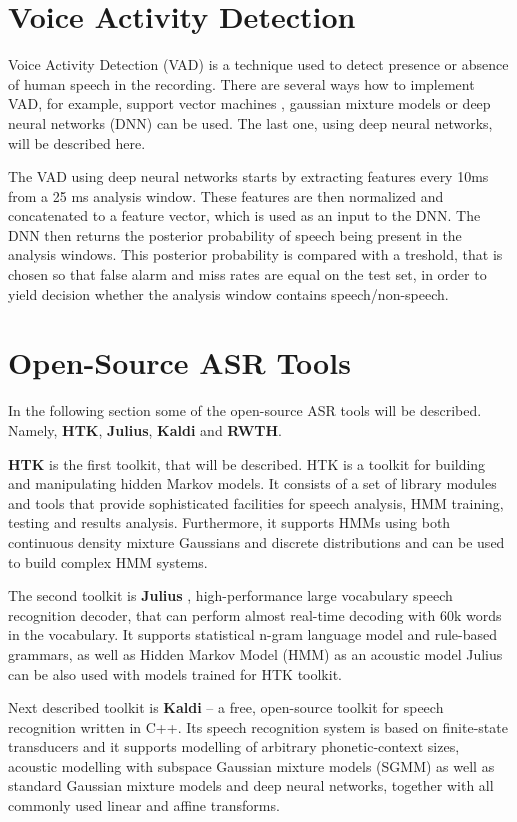 \section{Voice Activity Detection}
Voice Activity Detection (VAD) is a technique used to detect presence or absence of human speech in the recording.
There are several ways how to implement VAD,
  for example, support vector machines \cite{mesgarani2006discrimination}, gaussian mixture models \cite{ng2012developing} or deep neural networks (DNN) \cite{ryant2013speech} can be used.
The last one, using deep neural networks, will be described here.

The VAD using deep neural networks starts by extracting features every 10ms from a 25 ms analysis window.
These features are then normalized and concatenated to a feature vector,
  which is used as an input to the DNN.
The DNN then returns the posterior probability of speech being present in the analysis windows.
This posterior probability is compared with a treshold,
  that is chosen so that false alarm and miss rates are equal on the test set,
  in order to yield decision whether the analysis window contains speech/non-speech.

\section{Open-Source ASR Tools}
In the following section some of the open-source ASR tools will be described.
Namely, \textbf{HTK}, \textbf{Julius}, \textbf{Kaldi} and \textbf{RWTH}.

\textbf{HTK} \cite{young1997htk} is the first toolkit, that will be described.
HTK is a toolkit for building and manipulating hidden Markov models.
It consists of a set of library modules and tools that provide sophisticated facilities for speech analysis, HMM training, testing and results analysis.
Furthermore, it supports HMMs using both continuous density mixture Gaussians and discrete distributions and can be used to build complex HMM systems.

The second toolkit is \textbf{Julius} \cite{lee2001julius}, high-performance large vocabulary speech recognition decoder,
  that can perform almost real-time decoding with 60k words in the vocabulary.
It supports statistical n-gram language model and rule-based grammars,
  as well as Hidden Markov Model (HMM) as an acoustic model
Julius can be also used with models trained for HTK toolkit.

Next described toolkit is \textbf{Kaldi} \cite{povey2011kaldi} -- a free, open-source toolkit for speech recognition written in C++.
Its speech recognition system is based on finite-state transducers
  and it supports modelling of arbitrary phonetic-context sizes,
  acoustic modelling with subspace Gaussian mixture models (SGMM)
  as well as standard Gaussian mixture models and deep neural networks,
  together with all commonly used linear and affine transforms.

